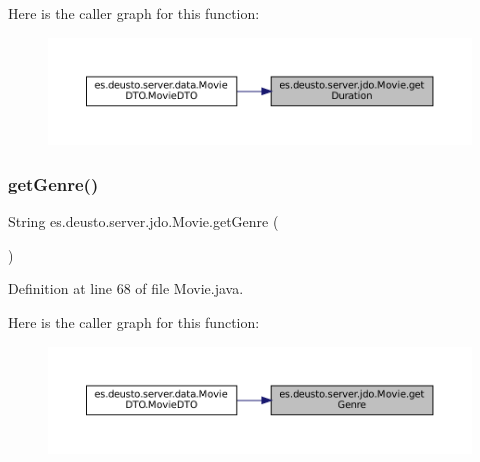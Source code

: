 Here is the caller graph for this function\+:\nopagebreak
\begin{figure}[H]
\begin{center}
\leavevmode
\includegraphics[width=350pt]{classes_1_1deusto_1_1server_1_1jdo_1_1_movie_a3c056812ade3ddfa59723e5181c90206_icgraph}
\end{center}
\end{figure}
\mbox{\label{classes_1_1deusto_1_1server_1_1jdo_1_1_movie_a5505376d4003bcfa7603fc1a707e2528}} 
\subsubsection{\texorpdfstring{getGenre()}{getGenre()}}
{\footnotesize\ttfamily String es.\+deusto.\+server.\+jdo.\+Movie.\+get\+Genre (\begin{DoxyParamCaption}{ }\end{DoxyParamCaption})}



Definition at line 68 of file Movie.\+java.

Here is the caller graph for this function\+:\nopagebreak
\begin{figure}[H]
\begin{center}
\leavevmode
\includegraphics[width=350pt]{classes_1_1deusto_1_1server_1_1jdo_1_1_movie_a5505376d4003bcfa7603fc1a707e2528_icgraph}
\end{center}
\end{figure}
\mbox{\label{classes_1_1deusto_1_1server_1_1jdo_1_1_movie_a4d2758ed2b7a03bd95646f67c046e043}} 
